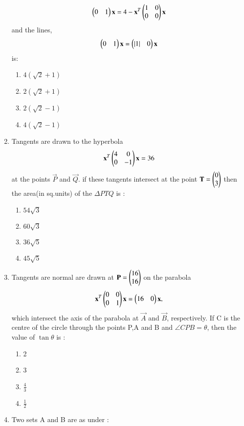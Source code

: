 \documentclass[journal,12pt,twocolumn]{IEEEtran}
\begin{document}
\begin{enumerate}[label=\arabic*]
    \begin{align}
    \begin{pmatrix}0&1\end{pmatrix}\mathbf{x}=4-\mathbf{x}^T\begin{pmatrix}1&0\\0&0\end{pmatrix}\mathbf{x}
    \end{align} and the lines,
    \begin{align}
    \begin{pmatrix}0&1\end{pmatrix}\mathbf{x}=\begin{pmatrix}\left\vert1\right\vert&0\end{pmatrix}\mathbf{x}
    \end{align} is:
    \begin{enumerate}
    \item $4(\sqrt{2}+1)$
    \item $2(\sqrt{2}+1)$
    \item $2(\sqrt{2}-1)$
    \item $4(\sqrt{2}-1)$
    \end{enumerate}
    \item Tangents are drawn to the hyperbola 
    \begin{align}
    \mathbf{x}^T\begin{pmatrix}4&0\\0&-1\end{pmatrix}\mathbf{x}=36
    \end{align} at the points $\vec{P}$ and $\vec{Q}$. if these tangents intersect at the point 
    $\mathbf{T} = \begin{pmatrix}0\\3\end{pmatrix}$ then the area(in sq.units) of the $\Delta PTQ$ is :
    \begin{enumerate}
    \item $54\sqrt{3}$
    \item $60\sqrt{3}$
    \item $36\sqrt{5}$
    \item $45{\sqrt{5}}$
    \end{enumerate}
    \item Tangents are normal are drawn at $\mathbf{P} = \begin{pmatrix}16\\16\end{pmatrix}$ on the parabola
    \begin{align}
    \mathbf{x}^T\begin{pmatrix}0&0\\0&1\end{pmatrix}\mathbf{x}=\begin{pmatrix}16&0\end{pmatrix}\mathbf{x},
    \end{align} which intersect the axis of the parabola at $\vec{A}$ and $\vec{B}$, respectively.
    If C is the centre of the circle through the points P,A and B and
    $\angle CPB=\theta$, then the value of $\tan\theta$ is :
    \begin{enumerate}
    \item 2
    \item 3
    \item $\frac{4}{3}$
    \item $\frac{1}{2}$
    \end{enumerate}
    \item Two sets  A and B are as under :

\end{enumerate}
\end{document}
